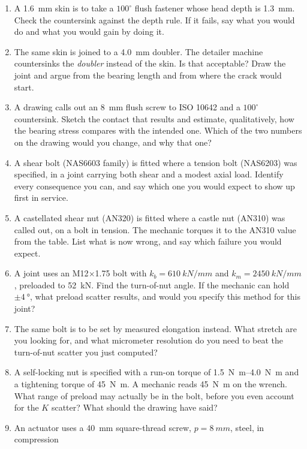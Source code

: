 \documentclass[11pt,a4paper]{article}
\begin{document}
\begin{enumerate}[nosep,leftmargin=1.5em]
  \item A \SI{1.6}{mm} skin is to take a $100^\circ$ flush fastener whose head depth is
        \SI{1.3}{mm}. Check the countersink against the depth rule. If it fails, say what you would
        do and what you would gain by doing it.
  \item The same skin is joined to a \SI{4.0}{mm} doubler. The detailer machine countersinks the
        \emph{doubler} instead of the skin. Is that acceptable? Draw the joint and argue from the
        bearing length and from where the crack would start.
  \item A drawing calls out an \SI{8}{mm} flush screw to ISO 10642 and a $100^\circ$ countersink.
        Sketch the contact that results and estimate, qualitatively, how the bearing stress compares
        with the intended one. Which of the two numbers on the drawing would you change, and why that
        one?
  \item A shear bolt (NAS6603 family) is fitted where a tension bolt (NAS6203) was specified, in a
        joint carrying both shear and a modest axial load. Identify every consequence you can, and
        say which one you would expect to show up first in service.
  \item A castellated shear nut (AN320) is fitted where a castle nut (AN310) was called out, on a
        bolt in tension. The mechanic torques it to the AN310 value from the table. List what is now
        wrong, and say which failure you would expect.
  \item A joint uses an M12$\times$1.75 bolt with $k_b=\SI{610}{kN/mm}$ and
        $k_m=\SI{2450}{kN/mm}$, preloaded to \SI{52}{kN}. Find the turn-of-nut angle. If the
        mechanic can hold $\pm\SI{4}{\degree}$, what preload scatter results, and would you specify
        this method for this joint?
  \item The same bolt is to be set by measured elongation instead. What stretch are you looking for,
        and what micrometer resolution do you need to beat the turn-of-nut scatter you just computed?
  \item A self-locking nut is specified with a run-on torque of \SIrange{1.5}{4.0}{N.m} and a
        tightening torque of \SI{45}{N.m}. A mechanic reads \SI{45}{N.m} on the wrench. What range
        of preload may actually be in the bolt, before you even account for the $K$ scatter? What
        should the drawing have said?
  \item An actuator uses a \SI{40}{mm} square-thread screw, $p=\SI{8}{mm}$, steel, in compression

\end{enumerate}
\end{document}
